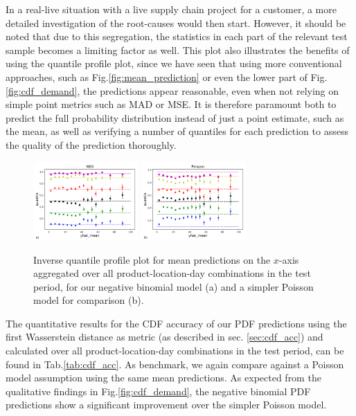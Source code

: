 \documentclass[BCOR=1mm, DIV=calc,10pt,
twoside=true,
twocolumn,
headings=normal]{scrartcl}
\newcommand{\fig}{Fig.}
\newcommand{\tab}{Tab.}
\begin{document}
\noindent
In a real-live situation with a live supply chain project for a customer, a more detailed investigation of the root-causes would then start. However, it should be noted that due to this segregation, the statistics in each part of the relevant test sample becomes a limiting factor as well. This plot also illustrates the benefits of using the quantile profile plot, since we have seen that using more conventional approaches, such as \fig \ref{fig:mean_prediction} or even the lower part of \fig \ref{fig:cdf_demand}, the predictions appear reasonable, even when not relying on simple point metrics such as MAD or MSE. It is therefore paramount both to predict the full probability distribution instead of just a point estimate, such as the mean, as well as verifying a number of quantiles for each prediction to assess the quality of the prediction thoroughly.

\begin{figure}
\begin{center}
\includegraphics[width=4cm]{../figures/invquant_yhat_mean_nbinom}
\includegraphics[width=4cm]{../figures/invquant_yhat_mean_poisson}
\caption{\label{fig:invquant_mean} Inverse quantile profile plot for mean predictions on the $x$-axis aggregated over all product-location-day combinations in the test period, for our negative binomial model (a) and a simpler Poisson model for comparison (b).}
\end{center}
\end{figure}

The quantitative results for the CDF accuracy of our PDF predictions using the first Wasserstein distance as metric (as described in sec. \ref{sec:cdf_acc}) and calculated over all product-location-day combinations in the test period, can be found in \tab \ref{tab:cdf_acc}. As benchmark, we again compare against a Poisson model assumption using the same mean predictions. As expected from the qualitative findings in \fig \ref{fig:cdf_demand}, the negative binomial PDF predictions show a significant improvement over the simpler Poisson model.
\end{document}
